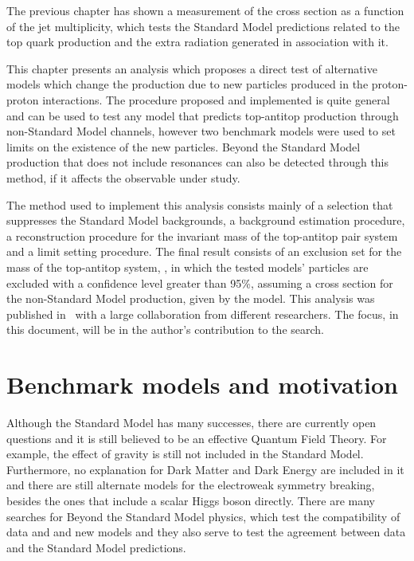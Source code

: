 
The previous chapter has shown a measurement of the \ttbar cross section as a function
of the jet multiplicity, which tests the Standard Model predictions related to the top quark
production and the extra radiation generated in association with it.

This chapter presents an analysis which proposes a direct test of alternative models which change the \ttbar production
due to new particles produced in the proton-proton interactions. The procedure proposed and implemented is quite general and can be
used to test any model that predicts top-antitop production through non-Standard Model channels, however two benchmark models were used
to set limits on the existence of the new particles.
Beyond the Standard Model \ttbar production that does not include resonances
can also be detected through this method, if it affects
 the observable
under study.

The method used to implement this analysis consists mainly of a selection that suppresses the
Standard Model backgrounds, a background estimation procedure, a reconstruction procedure for the
invariant mass of the top-antitop pair system and a limit setting procedure. The final result
consists of an exclusion set for the mass of the top-antitop system, \mtt, in which the
tested models' particles are excluded with a confidence level greater than 95\%, assuming a cross section for the non-Standard Model production, given by the model.
This analysis was published in~\cite{ttres7paper} with a large collaboration from different researchers. The focus, in this document,
will be in the author's contribution to the search.

\section{Benchmark models and motivation}

Although the Standard Model has many successes, there are currently open questions and it is still believed to be an effective
Quantum Field Theory. For example, the effect of gravity is still not included in the Standard Model.
Furthermore, no explanation for Dark Matter and Dark Energy are included in it and there are still alternate models for the electroweak symmetry
breaking, besides the ones that include a scalar Higgs boson directly.
There are many searches for Beyond the Standard Model physics, which test the compatibility of data and and new models and they also serve
to test the agreement between data and the Standard Model predictions.


